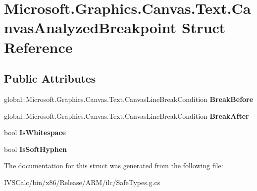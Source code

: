 \hypertarget{struct_microsoft_1_1_graphics_1_1_canvas_1_1_text_1_1_canvas_analyzed_breakpoint}{}\section{Microsoft.\+Graphics.\+Canvas.\+Text.\+Canvas\+Analyzed\+Breakpoint Struct Reference}
\label{struct_microsoft_1_1_graphics_1_1_canvas_1_1_text_1_1_canvas_analyzed_breakpoint}
\subsection*{Public Attributes}
\begin{DoxyCompactItemize}
\item 
\mbox{\label{struct_microsoft_1_1_graphics_1_1_canvas_1_1_text_1_1_canvas_analyzed_breakpoint_a052534ce25a7f1001a09b331066fe7c7}} 
global\+::\+Microsoft.\+Graphics.\+Canvas.\+Text.\+Canvas\+Line\+Break\+Condition {\bfseries Break\+Before}
\item 
\mbox{\label{struct_microsoft_1_1_graphics_1_1_canvas_1_1_text_1_1_canvas_analyzed_breakpoint_a481cbe040bb20432ef41adf1bdc26b3d}} 
global\+::\+Microsoft.\+Graphics.\+Canvas.\+Text.\+Canvas\+Line\+Break\+Condition {\bfseries Break\+After}
\item 
\mbox{\label{struct_microsoft_1_1_graphics_1_1_canvas_1_1_text_1_1_canvas_analyzed_breakpoint_af4dda184e8c96005178ea1ece2d85406}} 
bool {\bfseries Is\+Whitespace}
\item 
\mbox{\label{struct_microsoft_1_1_graphics_1_1_canvas_1_1_text_1_1_canvas_analyzed_breakpoint_ae6eaea4d679a364df2905867b5f8d66f}} 
bool {\bfseries Is\+Soft\+Hyphen}
\end{DoxyCompactItemize}


The documentation for this struct was generated from the following file\+:\begin{DoxyCompactItemize}
\item 
I\+V\+S\+Calc/bin/x86/\+Release/\+A\+R\+M/ilc/Safe\+Types.\+g.\+cs\end{DoxyCompactItemize}
